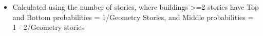 \begin{itemize}
\item Calculated using the number of stories, where buildings >=2 stories have Top and Bottom probabilities = 1/Geometry Stories, and Middle probabilities = 1 - 2/Geometry stories
\end{itemize}
